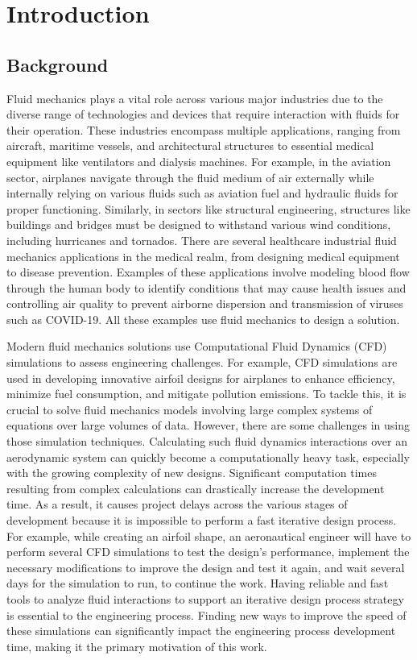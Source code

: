 
\chapter {Introduction}
\label{ch:Introduction}

\section{Background}
\label{sec:Background}
Fluid mechanics plays a vital role across various major industries due to the diverse range of technologies and devices that require interaction with fluids for their operation. These industries encompass multiple applications, ranging from aircraft, maritime vessels, and architectural structures to essential medical equipment like ventilators and dialysis machines. For example, in the aviation sector, airplanes navigate through the fluid medium of air externally while internally relying on various fluids such as aviation fuel and hydraulic fluids for proper functioning. Similarly, in sectors like structural engineering, structures like buildings and bridges must be designed to withstand various wind conditions, including hurricanes and tornados. There are several healthcare industrial fluid mechanics applications in the medical realm, from designing medical equipment to disease prevention. Examples of these applications involve modeling blood flow through the human body to identify conditions that may cause health issues and controlling air quality to prevent airborne dispersion and transmission of viruses such as COVID-19. All these examples use fluid mechanics to design a solution.

Modern fluid mechanics solutions use Computational Fluid Dynamics (CFD) simulations to assess engineering challenges. For example, CFD simulations are used in developing innovative airfoil designs for airplanes to enhance efficiency, minimize fuel consumption, and mitigate pollution emissions. To tackle this, it is crucial to solve fluid mechanics models involving large complex systems of equations over large volumes of data. However, there are some challenges in using those simulation techniques. Calculating such fluid dynamics interactions over an aerodynamic system can quickly become a computationally heavy task, especially with the growing complexity of new designs. Significant computation times resulting from complex calculations can drastically increase the development time. As a result, it causes project delays across the various stages of development because it is impossible to perform a fast iterative design process. For example, while creating an airfoil shape, an aeronautical engineer will have to perform several CFD simulations to test the design's performance, implement the necessary modifications to improve the design and test it again, and wait several days for the simulation to run, to continue the work. Having reliable and fast tools to analyze fluid interactions to support an iterative design process strategy is essential to the engineering process. Finding new ways to improve the speed of these simulations can significantly impact the engineering process development time, making it the primary motivation of this work.

